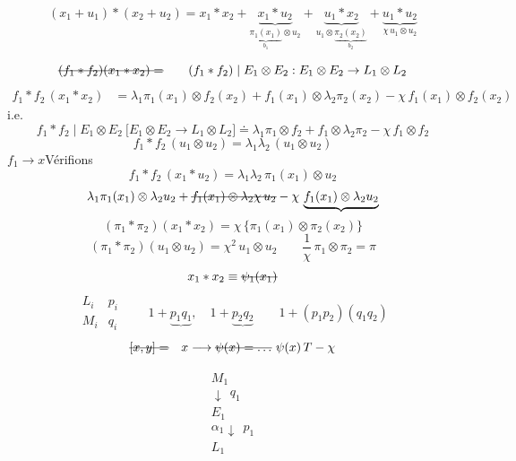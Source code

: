 \documentclass[11pt,a4paper]{article}
\begin{document}
\[
  (x_1 + u_1) * (x_2 + u_2) = x_1 * x_2
  + \underbrace{x_1 * u_2}_{\underbrace{\pi_1(x_1)}_{b_1} \otimes u_2}
  + \underbrace{u_1 * x_2}_{u_1 \otimes \underbrace{\pi_2(x_2)}_{b_2}}
  + \underbrace{u_1 * u_2}_{\chi\, u_1 \otimes u_2}
\]

\[
  \text{\struck{$(f_1 * f_2)(x_1 * x_2) =$}}
  \qquad
  (f_1 * f_2) \mid E_1 \otimes E_2 : E_1 \otimes E_2 \to L_1 \otimes L_2
\]
\[
  \boxed{
  \begin{aligned}
    f_1 * f_2\,(x_1 * x_2) &= \lambda_1\pi_1(x_1) \otimes f_2(x_2)
    + f_1(x_1) \otimes \lambda_2\pi_2(x_2) - \chi\, f_1(x_1) \otimes f_2(x_2)
  \end{aligned}}
\]
i.e.
\[
  f_1 * f_2 \mid E_1 \otimes E_2 \ \bigl[E_1 \otimes E_2 \to L_1 \otimes L_2\bigr]
  \doteq \lambda_1\pi_1 \otimes f_2 + f_1 \otimes \lambda_2\pi_2 - \chi\, f_1 \otimes f_2
\]
\[
  f_1 * f_2\,(u_1 \otimes u_2) = \lambda_1\lambda_2\,(u_1 \otimes u_2)
\]
$f_1 \longrightarrow x$\quad Vérifions
\[
  f_1 * f_2\,(x_1 * u_2) = \lambda_1\lambda_2\, \pi_1(x_1) \otimes u_2
\]
\[
  \lambda_1\pi_1(x_1) \otimes \lambda_2 u_2
  + \text{\struck{$f_1(x_1) \otimes \lambda_2\chi\, u_2$}}
  - \chi\, \underbrace{f_1(x_1) \otimes \lambda_2 u_2}
\]
\[
  (\pi_1 * \pi_2)(x_1 * x_2) = \chi\,\{\pi_1(x_1) \otimes \pi_2(x_2)\}
\]
\[
  (\pi_1 * \pi_2)(u_1 \otimes u_2) = \chi^2\, u_1 \otimes u_2
  \qquad
  \frac{1}{\chi}\,\pi_1 \otimes \pi_2 = \pi
\]
\[
  x_1 * x_2 \equiv \text{\struck{$\psi_1(x_1)$}}
\]
\[
  \begin{array}{ll}
    L_i & p_i \\ M_i & q_i
  \end{array}
  \qquad
  1 + \underbrace{p_1 q_1},\quad 1 + \underbrace{p_2 q_2}
  \qquad 1 + (p_1 p_2)(q_1 q_2)
\]
\[
  \text{\struck{$[x,y] =$}}\quad
  x \longrightarrow \text{\struck{$\psi(x) = \ldots$}}\ \psi(x)\,T - \chi
\]

\[
  \begin{array}{l}
    M_1 \\ \downarrow\ \ q_1 \\ E_1 \\ \alpha_1 \downarrow\ \ p_1 \\ L_1
  \end{array}
\]
\end{document}
